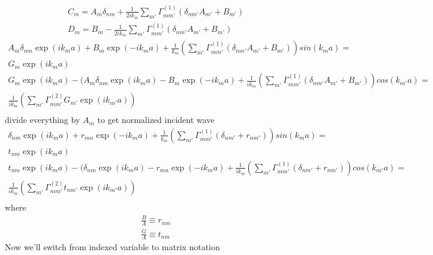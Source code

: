 \begin{equation}
\begin{gathered}
C_m = A_m \delta_{nm} + \frac{1}{2 i k_m}\sum_{m'}\Gamma_{mm'}^{(1)} 
(\delta_{nm'} A_{m'}+B_{m'}) \\
D_m = B_m - \frac{1}{2 i k_m}\sum_{m'}\Gamma_{mm'}^{(1)} 
(\delta_{nm'} A_{m'}+B_{m'})
\end{gathered}
\end{equation}
\begin{equation}
\begin{gathered}
A_m \delta_{nm} \exp(i k_m a)+B_m \exp(-i k_m a) + 
\frac{1}{k_m}(\sum_{m'}\Gamma_{mm'}^{(1)}(\delta_{nm'} A_{m'}+B_{m'})) sin(k_m a) = \\
G_m \exp(i k_m a) \\
G_m \exp(i k_m a) - (A_m \delta_{nm} \exp(i k_m a)-B_m \exp(-i k_m a) + 
\frac{1}{i k_m}(\sum_{m'}\Gamma_{mm'}^{(1)}(\delta_{nm'} A_{m'}+B_{m'})) cos(k_{m'} a) = \\
\frac{1}{i k_m}(\sum_{m'}\Gamma_{mm'}^{(2)} G_{m'} \exp(i k_{m'} a)) \\
\end{gathered}
\end{equation}
divide everything by $A_m$ to get normalized incident wave
\begin{equation}
\begin{gathered}
\delta_{nm} \exp(i k_m a)+r_{mn} \exp(-i k_m a) + 
\frac{1}{k_m}(\sum_{m'}\Gamma_{mm'}^{(1)}(\delta_{nm'}+r_{nm'})) sin(k_m a) = \\
t_{nm} \exp(i k_m a) \\
t_{nm} \exp(i k_m a) - (\delta_{nm} \exp(i k_m a)-r_{mn} \exp(-i k_m a) + 
\frac{1}{i k_m}(\sum_{m'}\Gamma_{mm'}^{(1)}(\delta_{nm'}+r_{nm'})) cos(k_{m'} a) = \\
\frac{1}{i k_m}(\sum_{m'}\Gamma_{mm'}^{(2)} t_{nm'} \exp(i k_{m'} a)) \\
\end{gathered}
\end{equation}
where 
\begin{equation}
\begin{gathered}
\frac{B}{A} \equiv r_{nm} \\
\frac{G}{A} \equiv t_{nm}
\end{gathered}
\end{equation}
Now we'll switch from indexed variable to matrix notation

